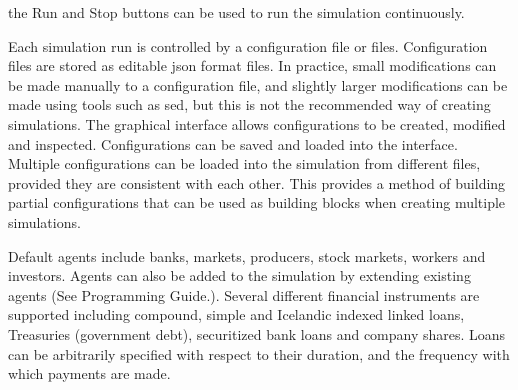 \documentclass[10pt,oneside,openright, a4paper]{memoir}
\begin{document}
the Run and Stop buttons can be used to run the simulation continuously.
\par
Each simulation run is controlled by a configuration file or files. 
Configuration files are stored as editable json format 
files. In practice, small modifications can be made manually
to a configuration file, and slightly larger modifications can be made using tools
such as sed, but this is not the recommended way of
creating simulations. The graphical interface allows configurations
to be created, modified and inspected. Configurations can be saved and
loaded into the interface. Multiple configurations can be loaded into the simulation
from different files, provided they are consistent with each other. This 
provides a method of building partial configurations
that can be used as building blocks when creating multiple simulations.
\par
Default agents include banks, markets, producers, stock markets, workers
and investors. Agents can also be added to the simulation by extending
existing agents (See Programming Guide.). Several different financial
instruments are supported including compound, simple and Icelandic
indexed linked loans, Treasuries (government debt), securitized bank loans
and company shares. Loans can be arbitrarily specified with respect
to their duration, and the frequency with which payments are made.
\par
\end{document}
